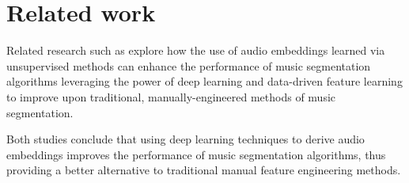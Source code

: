 \section{Related work}

Related research such as \cite{deepfeaturesegment, SalamonDeepSegmentation} explore how the use of audio embeddings learned via unsupervised methods can enhance the performance of music segmentation algorithms leveraging the power of deep learning and data-driven feature learning to improve upon traditional, manually-engineered methods of music segmentation. 

Both studies conclude that using deep learning techniques to derive audio embeddings improves the performance of music segmentation algorithms, thus providing a better alternative to traditional manual feature engineering methods.

